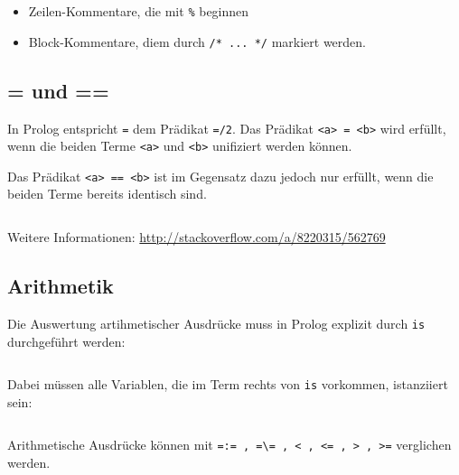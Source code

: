 \begin{itemize}
    \item Zeilen-Kommentare, die mit \verb+%+ beginnen
    \item Block-Kommentare, diem durch \verb+/* ... */+ markiert werden.
\end{itemize}

\subsection{= und ==}
In Prolog entspricht \texttt{=} dem Prädikat \texttt{=/2}. Das Prädikat \texttt{<a> = <b>} wird
erfüllt, wenn die beiden Terme \texttt{<a>} und \texttt{<b>} unifiziert werden
können.

Das Prädikat \texttt{<a> == <b>} ist im Gegensatz dazu jedoch nur erfüllt, wenn
die beiden Terme bereits identisch sind.

\begin{beispiel}[= und ==]
    \inputminted[numbersep=5pt, tabsize=4]{prolog}{scripts/prolog/equal.pl}
\end{beispiel}

Weitere Informationen: \url{http://stackoverflow.com/a/8220315/562769}

\subsection{Arithmetik}
Die Auswertung artihmetischer Ausdrücke muss in Prolog explizit durch \texttt{is}
durchgeführt werden:

\inputminted[numbersep=5pt, tabsize=4]{prolog}{scripts/prolog/arithmetik.pl}

Dabei müssen alle Variablen, die im Term rechts von \texttt{is} vorkommen, 
istanziiert sein:

\inputminted[numbersep=5pt, tabsize=4]{prolog}{scripts/prolog/arithmetik-fail.pl}

Arithmetische Ausdrücke können mit \texttt{=:= , =\textbackslash= , < , <= , > , >=}
verglichen werden.

\begin{beispiel}
    \begin{bspenum}
        \item \inputminted[numbersep=5pt, tabsize=4]{prolog}{scripts/prolog/even.pl}
        \item \inputminted[numbersep=5pt, tabsize=4]{prolog}{scripts/prolog/fibonacci2.pl}
    \end{bspenum}
\end{beispiel}


